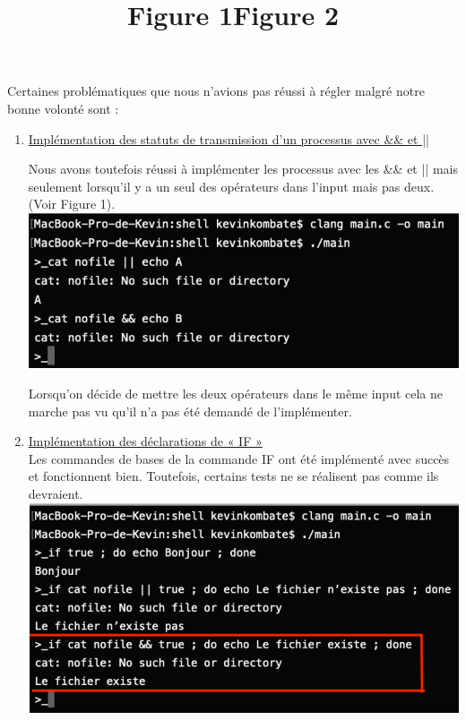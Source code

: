 \documentclass[12pt]{article}
\begin{document}
Certaines problématiques que nous n’avions pas réussi à régler malgré notre bonne volonté sont :\\
\begin{enumerate}
\item \underline{Implémentation des statuts de transmission d’un processus avec \&\& et ||} \vspace{0,1cm}

Nous avons toutefois réussi à implémenter les processus avec les \&\& et || mais seulement lorsqu’il y a un seul des opérateurs dans l’input mais pas deux. (Voir Figure 1).\\

\includegraphics[scale=1]{fig1.png}
\title{Figure 1}\vspace{0,3cm}

Lorsqu’on décide de mettre les deux opérateurs dans le même input cela ne marche pas vu qu’il n’a pas été demandé de l’implémenter.\vspace{0,5cm}

\item \underline{Implémentation des déclarations de « IF »} \\

Les commandes de bases de la commande IF ont été implémenté avec succès et fonctionnent bien. Toutefois, certains tests ne se réalisent pas comme ils devraient. \\

\includegraphics[scale=1]{fig2.png}
\title{Figure 2}
\newpage


\end{enumerate}
\end{document}
